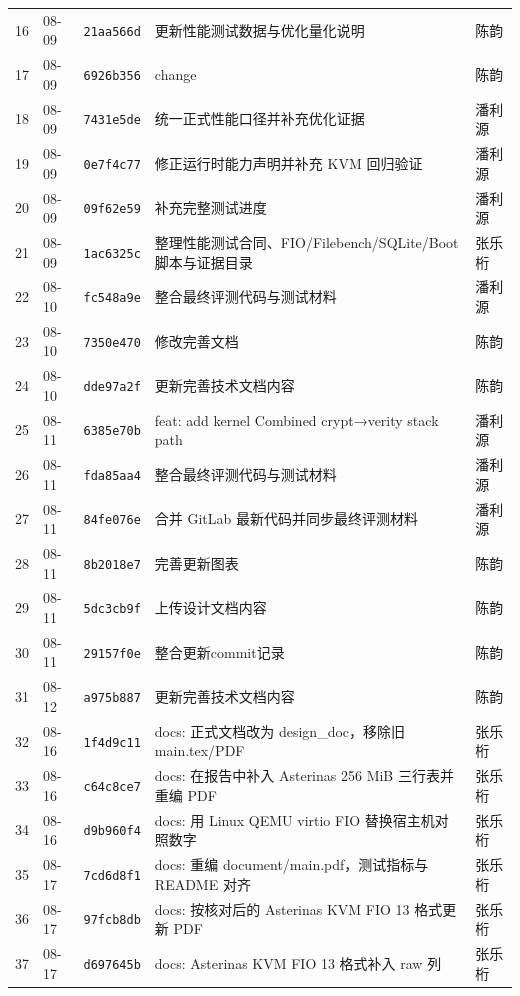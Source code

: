 \begin{longtable}{p{}p{}p{}p{}p{}}
    16 & 08-09 & \texttt{21aa566d} & 更新性能测试数据与优化量化说明 & 陈韵 \\
    17 & 08-09 & \texttt{6926b356} & change & 陈韵 \\
    18 & 08-09 & \texttt{7431e5de} & 统一正式性能口径并补充优化证据 & 潘利源 \\
    19 & 08-09 & \texttt{0e7f4c77} & 修正运行时能力声明并补充 KVM 回归验证 & 潘利源 \\
    20 & 08-09 & \texttt{09f62e59} & 补充完整测试进度 & 潘利源 \\
    21 & 08-09 & \texttt{1ac6325c} & 整理性能测试合同、FIO/Filebench/SQLite/Boot 脚本与证据目录 & 张乐桁 \\
    22 & 08-10 & \texttt{fc548a9e} & 整合最终评测代码与测试材料 & 潘利源 \\
    23 & 08-10 & \texttt{7350e470} & 修改完善文档 & 陈韵 \\
    24 & 08-10 & \texttt{dde97a2f} & 更新完善技术文档内容 & 陈韵 \\
    25 & 08-11 & \texttt{6385e70b} & feat: add kernel Combined crypt→verity stack path & 潘利源 \\
    26 & 08-11 & \texttt{fda85aa4} & 整合最终评测代码与测试材料 & 潘利源 \\
    27 & 08-11 & \texttt{84fe076e} & 合并 GitLab 最新代码并同步最终评测材料 & 潘利源 \\
    28 & 08-11 & \texttt{8b2018e7} & 完善更新图表 & 陈韵 \\
    29 & 08-11 & \texttt{5dc3cb9f} & 上传设计文档内容 & 陈韵 \\
    30 & 08-11 & \texttt{29157f0e} & 整合更新commit记录 & 陈韵 \\
    31 & 08-12 & \texttt{a975b887} & 更新完善技术文档内容 & 陈韵 \\
    32 & 08-16 & \texttt{1f4d9c11} & docs: 正式文档改为 design\_doc，移除旧 main.tex/PDF & 张乐桁 \\
    33 & 08-16 & \texttt{c64c8ce7} & docs: 在报告中补入 Asterinas 256 MiB 三行表并重编 PDF & 张乐桁 \\
    34 & 08-16 & \texttt{d9b960f4} & docs: 用 Linux QEMU virtio FIO 替换宿主机对照数字 & 张乐桁 \\
    35 & 08-17 & \texttt{7cd6d8f1} & docs: 重编 document/main.pdf，测试指标与 README 对齐 & 张乐桁 \\
    36 & 08-17 & \texttt{97fcb8db} & docs: 按核对后的 Asterinas KVM FIO 13 格式更新 PDF & 张乐桁 \\
    37 & 08-17 & \texttt{d697645b} & docs: Asterinas KVM FIO 13 格式补入 raw 列 & 张乐桁 \\

\end{longtable}
